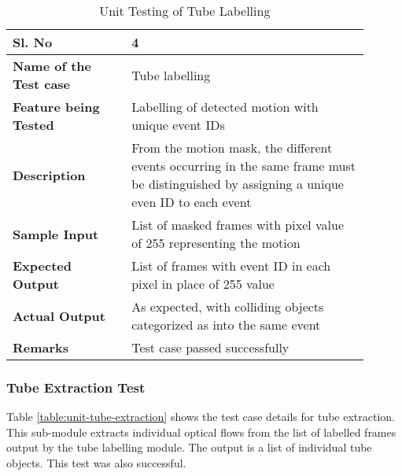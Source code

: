         \FloatBarrier
        \begin{table}[H]
            \caption{Unit Testing of Tube Labelling}
            \begin{tabular}{|p{0.3\linewidth}|p{0.6\linewidth}|}
                \hline
                \textbf{Sl. No }              &\textbf{ 4}\\
                \hline
                \textbf{Name of the Test case}& Tube labelling \\
                \hline
                \textbf{Feature being Tested}  & Labelling of detected motion
                with unique event IDs \\
                \hline
                \textbf{Description}           & From the motion mask, the
                different events occurring in the same frame must be
                distinguished by assigning a unique even ID to each event \\
                \hline
                \textbf{Sample Input}          & List of masked frames with
                pixel value of 255 representing the motion \\
                \hline
                \textbf{Expected Output}       & List of frames with event ID
                in each pixel in place of 255 value  \\
                \hline
                \textbf{Actual Output}         & As expected, with colliding
                objects categorized as into the same event \\
                \hline
                \textbf{Remarks }              & Test case passed successfully \\
                \hline
            \end{tabular}
            \label{table:unit-tube-labelling}
        \end{table}


        \subsubsection{Tube Extraction Test}

        Table \ref{table:unit-tube-extraction} shows the test case details for
        tube extraction. This sub-module extracts individual optical flows from
        the list of labelled frames output by the tube labelling module. The
        output is a list of individual tube objects. This test was also
        successful.

